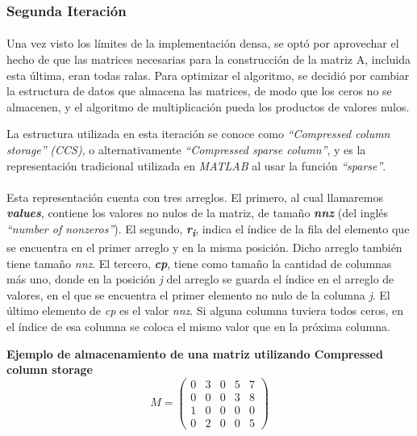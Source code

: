 \documentclass[a4paper,11pt]{article}
\begin{document}
\subsubsection{Segunda Iteraci\'on}
\paragraph{}
Una vez visto los l\'imites de la implementaci\'on densa, se opt\'o por aprovechar el
hecho de que las matrices necesarias para la construcci\'on de la matriz A,
incluida esta \'ultima, eran todas ralas.  Para optimizar el algoritmo, se
decidi\'o por cambiar la estructura de datos que almacena las matrices, de modo
que los ceros no se almacenen, y el algoritmo de multiplicaci\'on pueda los productos
de valores nulos.

La estructura utilizada en esta iteraci\'on se conoce como \emph{``Compressed
column storage''} \emph{(CCS)}, o alternativamente \emph{``Compressed sparse
column''}, y es la representaci\'on tradicional utilizada en \emph{MATLAB} al
usar la funci\'on \emph{``sparse''}.
\paragraph{}
Esta representaci\'on cuenta con tres arreglos. El primero, al cual llamaremos
\textbf{\emph{values}}, contiene los valores no nulos de la matriz, de tamaño
\textbf{\emph{nnz}} (del ingl\'es \emph{``number of nonzeros''}). El segundo,
\textbf{\emph{r\textsubscript{i}}}, indica el \'indice de la fila del elemento
que se encuentra en el primer arreglo y en la misma posici\'on. Dicho arreglo
tambi\'en tiene tamaño \emph{nnz}. El tercero, \textbf{\emph{cp}}, tiene como
tamaño la cantidad de columnas m\'as uno, donde en la posici\'on \emph{j} del
arreglo se guarda el \'indice en el arreglo de valores, en el que se encuentra
el primer elemento no nulo de la columna \emph{j}. El \'ultimo elemento de
\emph{cp} es el valor \emph{nnz}. Si alguna columna tuviera todos ceros, en el
\'indice de esa columna se coloca el mismo valor que en la pr\'oxima columna.

\textbf{Ejemplo de almacenamiento de una matriz utilizando Compressed column storage}\\
\[ M = \left( \begin{array}{ccccc}
0 & 3 & 0 & 5 & 7 \\
0 & 0 & 0 & 3 & 8 \\
1 & 0 & 0 & 0 & 0 \\
0 & 2 & 0 & 0 & 5\end{array} \right)\]
\end{document}
